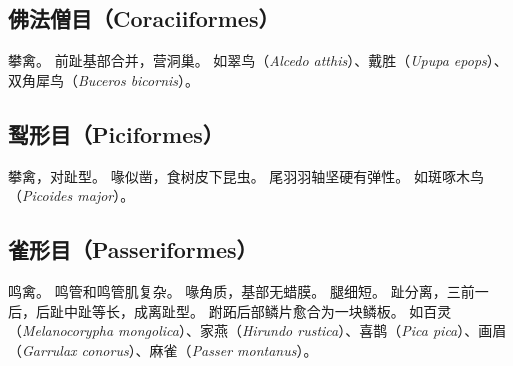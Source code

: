 \documentclass[11pt]{article}
\begin{document}
\subsection{佛法僧目（Coraciiformes）}
攀禽。
前趾基部合并，营洞巢。
如翠鸟（\textit{Alcedo atthis}）、戴胜（\textit{Upupa epops}）、双角犀鸟（\textit{Buceros bicornis}）。

\subsection{䴕形目（Piciformes）}
攀禽，对趾型。
喙似凿，食树皮下昆虫。
尾羽羽轴坚硬有弹性。
如斑啄木鸟（\textit{Picoides major}）。

\subsection{雀形目（Passeriformes）}
鸣禽。
鸣管和鸣管肌复杂。
喙角质，基部无蜡膜。
腿细短。
趾分离，三前一后，后趾中趾等长，成离趾型。
跗跖后部鳞片愈合为一块鳞板。
如百灵（\textit{Melanocorypha mongolica}）、家燕（\textit{Hirundo rustica}）、喜鹊（\textit{Pica pica}）、画眉（\textit{Garrulax conorus}）、麻雀（\textit{Passer montanus}）。
\end{document}
